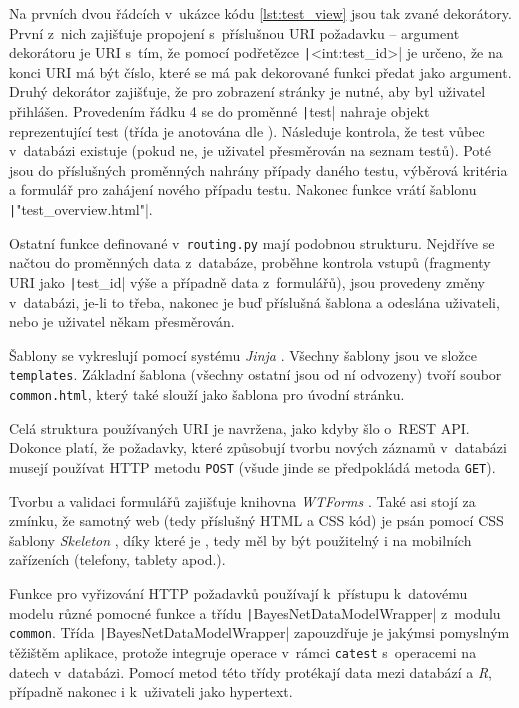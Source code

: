 \documentclass[a4paper,twoside,12pt]{scrbook}
\begin{document}
Na prvních dvou řádcích v~ukázce kódu \ref{lst:test_view} jsou tak zvané dekorátory. První z~nich zajišťuje propojení s~příslušnou URI požadavku -- argument dekorátoru je URI s~tím, že pomocí podřetězce \texttt|<int:test_id>| je určeno, že na konci URI má být číslo, které se má pak dekorované funkci předat jako argument. Druhý dekorátor zajišťuje, že pro zobrazení stránky je nutné, aby byl uživatel přihlášen. Provedením řádku 4 se do proměnné \texttt|test| nahraje objekt reprezentující test (třída je anotována dle \cite{PEP484}). Následuje kontrola, že test vůbec v~databázi existuje (pokud ne, je uživatel přesměrován na seznam testů). Poté jsou do příslušných proměnných nahrány případy daného testu, výběrová kritéria a formulář pro zahájení nového případu testu. Nakonec funkce vrátí  šablonu \texttt|"test_overview.html"|.

Ostatní funkce definované v~\texttt{routing.py} mají podobnou strukturu. Nejdříve se načtou do proměnných data z~databáze, proběhne kontrola vstupů (fragmenty URI jako \texttt|test_id| výše a případně data z~formulářů), jsou provedeny změny v~databázi, je-li to třeba, nakonec je buď  příslušná šablona a odeslána uživateli, nebo je uživatel někam přesměrován.

Šablony se vykreslují pomocí systému \textit{Jinja} \cite{jinja2}. Všechny šablony jsou ve složce \texttt{templates}. Základní šablona (všechny ostatní jsou od ní odvozeny) tvoří soubor \texttt{common.html}, který také slouží jako šablona pro úvodní stránku.

Celá struktura používaných URI je navržena, jako kdyby šlo o~REST API. Dokonce platí, že požadavky, které způsobují tvorbu nových záznamů v~databázi musejí používat HTTP metodu \texttt{POST} (všude jinde se předpokládá metoda \texttt{GET}).

Tvorbu a validaci formulářů zajišťuje knihovna \textit{WTForms} \cite{wtforms}. Také asi stojí za zmínku, že samotný web (tedy příslušný HTML a CSS kód) je psán pomocí CSS šablony \textit{Skeleton} \cite{skeleton.css}, díky které je , tedy měl by být použitelný i na mobilních zařízeních (telefony, tablety apod.).

Funkce pro vyřizování HTTP požadavků používají k~přístupu k~datovému modelu různé pomocné funkce a třídu \texttt|BayesNetDataModelWrapper| z~modulu \texttt{common}. Třída \texttt|BayesNetDataModelWrapper| zapouzdřuje je jakýmsi pomyslným těžištěm aplikace, protože integruje operace v~rámci \texttt{catest} s~operacemi na datech v~databázi. Pomocí metod této třídy protékají data mezi databází a \textit{R}, případně nakonec i k~uživateli jako hypertext.
\end{document}
